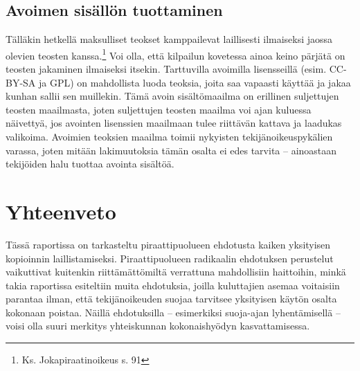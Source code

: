 \documentclass[titlepage,12pt]{article}
\begin{document}
\subsection{Avoimen sisällön tuottaminen}

Tälläkin hetkellä maksulliset teokset kamppailevat laillisesti
ilmaiseksi jaossa olevien teosten
kanssa.\footnote{Ks. Jokapiraatinoikeus s. 91} Voi olla, että
kilpailun kovetessa ainoa keino pärjätä on teosten jakaminen
ilmaiseksi itsekin.  Tarttuvilla avoimilla lisensseillä
(esim. CC-BY-SA ja GPL) on mahdollista luoda teoksia, joita saa
vapaasti käyttää ja jakaa kunhan sallii sen muillekin.  Tämä avoin
sisältömaailma on erillinen suljettujen teosten maailmasta, joten
suljettujen teosten maailma voi ajan kuluessa näivettyä, jos avointen
lisenssien maailmaan tulee riittävän kattava ja laadukas valikoima.
Avoimien teoksien maailma toimii nykyisten tekijänoikeuspykälien
varassa, joten mitään lakimuutoksia tämän osalta ei edes tarvita --
ainoastaan tekijöiden halu tuottaa avointa sisältöä.





\section{Yhteenveto}

Tässä raportissa on tarkasteltu piraattipuolueen ehdotusta kaiken
yksityisen kopioinnin laillistamiseksi.  Piraattipuolueen radikaalin
ehdotuksen perustelut vaikuttivat kuitenkin riittämättömiltä
verrattuna mahdollisiin haittoihin, minkä takia raportissa esiteltiin
muita ehdotuksia, joilla kuluttajien asemaa voitaisiin parantaa ilman,
että tekijänoikeuden suojaa tarvitsee yksityisen käytön osalta
kokonaan poistaa.  Näillä ehdotuksilla -- esimerkiksi suoja-ajan
lyhentämisellä -- voisi olla suuri merkitys yhteiskunnan
kokonaishyödyn kasvattamisessa.



\pagebreak


  

    
\end{document}
